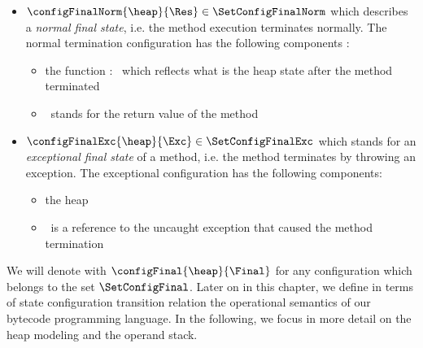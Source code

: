  \begin{itemize}
        \item  $\configFinalNorm{\heap}{\Res} \in \SetConfigFinalNorm $ which describes a \textit{normal final state}, i.e.
	       the method execution terminates normally. The normal termination configuration has the following components :
               \begin{itemize}
                      \item the function \heap : \HeapSet \ which reflects what is the heap state after the method terminated
		      
		      \item \Res \ stands for the return value  of the method
	       \end{itemize}

	\item  $\configFinalExc{\heap}{\Exc} \in \SetConfigFinalExc $ which stands for an 
               \textit{exceptional final state} of a method,
	       i.e. the method terminates by throwing an exception. The exceptional configuration has the following components:
               \begin{itemize}
                      \item the heap \heap 
		      \item \Exc \ is a reference to the uncaught exception that caused the method termination
               \end{itemize}

 \end{itemize}
  
 We will denote with $\configFinal{\heap}{\Final}$ for any configuration which belongs to the set  $\SetConfigFinal$. 
 Later on in this chapter, we define in terms of state configuration transition relation the operational semantics of
 our bytecode programming language.
 In the following, we focus in more detail on the heap modeling and the operand stack. 

